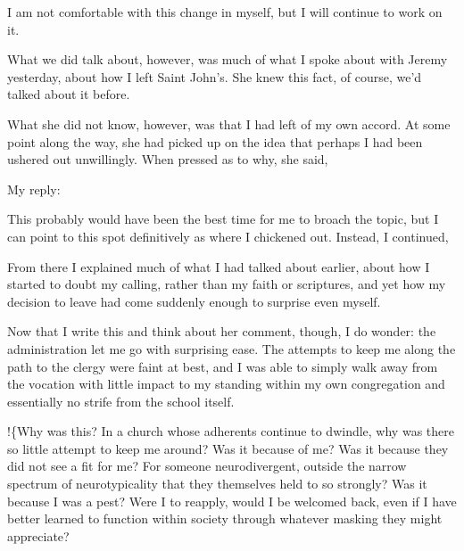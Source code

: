 I am not comfortable with this change in myself, but I will continue to work on it.

What we did talk about, however, was much of what I spoke about with Jeremy yesterday, about how I left Saint John's. She knew this fact, of course, we'd talked about it before.

What she did not know, however, was that I had left of my own accord. At some point along the way, she had picked up on the idea that perhaps I had been ushered out unwillingly. When pressed as to why, she said,


My reply:


This probably would have been the best time for me to broach the topic, but I can point to this spot definitively as where I chickened out. Instead, I continued,





From there I explained much of what I had talked about earlier, about how I started to doubt my calling, rather than my faith or scriptures, and yet how my decision to leave had come suddenly enough to surprise even myself.

Now that I write this and think about her comment, though, I do wonder: the administration let me go with surprising ease. The attempts to keep me along the path to the clergy were faint at best, and I was able to simply walk away from the vocation with little impact to my standing within my own congregation and essentially no strife from the school itself.

!\{Why was this? In a church whose adherents continue to dwindle, why was there so little attempt to keep me around? Was it because of me? Was it because they did not see a fit for me? For someone neurodivergent, outside the narrow spectrum of neurotypicality that they themselves held to so strongly? Was it because I was a pest? Were I to reapply, would I be welcomed back, even if I have better learned to function within society through whatever masking they might appreciate?

